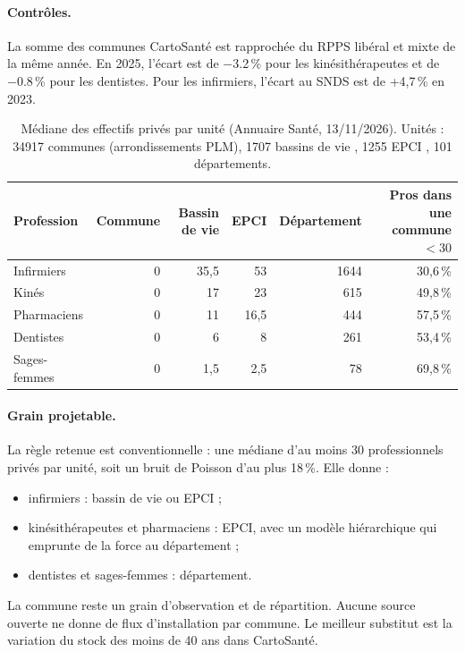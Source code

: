\documentclass[11pt]{article}
\begin{document}
\paragraph{Contrôles.} La somme des communes CartoSanté est rapprochée du RPPS libéral et mixte de la même année.
En 2025, l'écart est de \num{-3.2}\,\% pour les kinésithérapeutes et de \num{-0.8}\,\% pour les dentistes\mesure{}.
Pour les infirmiers, l'écart au SNDS est de +4,7\,\% en 2023\mesure{}.

\begin{table}[h]
\centering\small
\begin{tabular}{@{}lrrrrr@{}}
\toprule
Profession & Commune & Bassin de vie & EPCI & Département & Pros dans une commune $<30$ \\
\midrule
Infirmiers & 0 & 35,5 & 53 & \num{1644} & 30,6\,\% \\
Kinés & 0 & 17 & 23 & 615 & 49,8\,\% \\
Pharmaciens & 0 & 11 & 16,5 & 444 & 57,5\,\% \\
Dentistes & 0 & 6 & 8 & 261 & 53,4\,\% \\
Sages-femmes & 0 & 1,5 & 2,5 & 78 & 69,8\,\% \\
\bottomrule
\end{tabular}
\caption{Médiane des effectifs privés par unité (Annuaire Santé, 13/11/2026)\mesure{}. Unités : \num{34917}
communes (arrondissements PLM), \num{1707} bassins de vie \citep{insee2026bv}, \num{1255} EPCI
\citep{geoapi2026}, 101 départements.}
\label{tab:grain}
\end{table}

\paragraph{Grain projetable.} La règle retenue est conventionnelle : une médiane d'au moins 30 professionnels
privés par unité, soit un bruit de Poisson d'au plus 18\,\%\derive{}. Elle donne :
\begin{itemize}
  \item infirmiers : bassin de vie ou EPCI ;
  \item kinésithérapeutes et pharmaciens : EPCI, avec un modèle hiérarchique qui emprunte de la force au
  département ;
  \item dentistes et sages-femmes : département.
\end{itemize}
La commune reste un grain d'observation et de répartition. Aucune source ouverte ne donne de flux d'installation
par commune. Le meilleur substitut est la variation du stock des moins de 40 ans dans CartoSanté.
\end{document}
